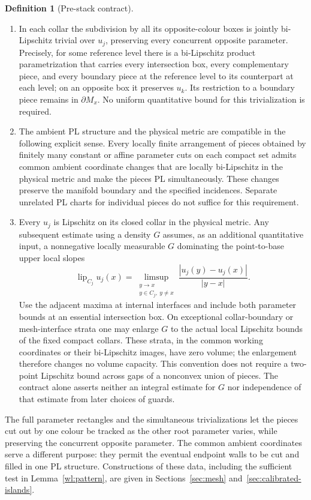 \documentclass[11pt]{article}
\numberwithin{equation}{section}
\theoremstyle{definition}
\newtheorem{definition}[theorem]{Definition}
\theoremstyle{remark}
\begin{document}
\begin{definition}[Pre-stack contract]
\begin{enumerate}
\item In each collar the subdivision by all its opposite-colour boxes
is jointly bi-Lipschitz trivial over $u_j$, preserving every concurrent
opposite parameter.  Precisely, for some reference level there is a
bi-Lipschitz product parametrization that carries every intersection
box, every complementary piece, and every boundary piece at the
reference level to its counterpart at each level; on an opposite box
it preserves $u_k$.  Its restriction to a boundary piece remains in
$\partial M_x$.  No uniform quantitative bound for this
trivialization is required.

\item The ambient PL structure and the physical metric are compatible
in the following explicit sense.  Every locally finite arrangement
of pieces obtained by finitely many constant or affine parameter cuts
on each compact set admits common ambient coordinate changes that are
locally bi-Lipschitz in the physical metric and make the pieces PL
simultaneously.  These changes preserve the manifold boundary and
the specified incidences.  Separate unrelated PL charts for individual
pieces do not suffice for this requirement.

\item Every $u_j$ is Lipschitz on its closed collar in the physical
metric.  Any subsequent estimate using a density $G$ assumes, as an
additional quantitative input, a nonnegative locally measurable $G$
dominating the point-to-base upper local slopes
\[
 \operatorname{lip}_{C_j}u_j(x)
   =\limsup_{\substack{y\to x\\y\in C_j,\ y\ne x}}
         \frac{|u_j(y)-u_j(x)|}{|y-x|}.
\]
Use the adjacent maxima at internal interfaces and include both
parameter bounds at an essential intersection box.  On exceptional
collar-boundary or mesh-interface strata one may enlarge $G$ to the
actual local Lipschitz bounds of the fixed compact collars.  These
strata, in the common working coordinates or their bi-Lipschitz
images, have zero volume; the enlargement therefore changes no
volume capacity.  This convention does not require a two-point
Lipschitz bound across gaps of a nonconvex union of pieces.  The
contract alone asserts neither an integral estimate for $G$ nor
independence of that estimate from later choices of guards.
\end{enumerate}
\end{definition}

The full parameter rectangles and the simultaneous trivializations
let the pieces cut out by one colour be tracked as the other root
parameter varies, while preserving the concurrent opposite parameter.
The common ambient coordinates
serve a different purpose: they permit the eventual endpoint walls to
be cut and filled in one PL structure.  Constructions of these data,
including the sufficient test in Lemma~\ref{wl:pattern}, are given in
Sections~\ref{sec:mesh} and~\ref{sec:calibrated-islands}.
\end{document}
